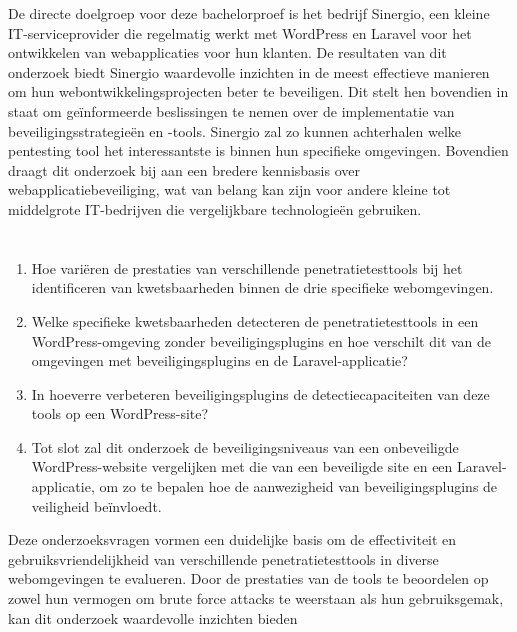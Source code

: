 De directe doelgroep voor deze bachelorproef is het bedrijf Sinergio, een kleine IT-serviceprovider die regelmatig 
werkt met WordPress en Laravel voor het ontwikkelen van webapplicaties voor hun klanten. De resultaten van dit 
onderzoek biedt Sinergio waardevolle inzichten in de meest effectieve manieren om hun webontwikkelingsprojecten beter 
te beveiligen. Dit stelt hen bovendien in staat om geïnformeerde beslissingen te nemen over de implementatie van 
beveiligingsstrategieën en -tools. Sinergio zal zo kunnen achterhalen welke pentesting tool het interessantste is binnen hun specifieke omgevingen.
Bovendien draagt dit onderzoek bij aan een bredere kennisbasis over webapplicatiebeveiliging, 
wat van belang kan zijn voor andere kleine tot middelgrote IT-bedrijven die vergelijkbare technologieën gebruiken.

\section{}%
\label{sec:onderzoeksvraag}
\begin{enumerate}
  \item Hoe variëren de prestaties van verschillende penetratietesttools bij het identificeren van kwetsbaarheden binnen de drie specifieke webomgevingen. 
  \item Welke specifieke kwetsbaarheden detecteren de penetratietesttools in een WordPress-omgeving zonder beveiligingsplugins en hoe verschilt dit van de omgevingen met beveiligingsplugins en de Laravel-applicatie? 
  \item In hoeverre verbeteren beveiligingsplugins de detectiecapaciteiten van deze tools op een WordPress-site? 
  \item Tot slot zal dit onderzoek de beveiligingsniveaus van een onbeveiligde WordPress-website vergelijken met die 
van een beveiligde site en een Laravel-applicatie, om zo te bepalen hoe de aanwezigheid van beveiligingsplugins de 
veiligheid beïnvloedt.
\end{enumerate}
Deze onderzoeksvragen vormen een duidelijke basis om de effectiviteit en gebruiksvriendelijkheid van 
verschillende penetratietesttools in diverse webomgevingen te evalueren. Door de prestaties van de 
tools te beoordelen op zowel hun vermogen om brute force attacks te weerstaan als hun gebruiksgemak, 
kan dit onderzoek waardevolle inzichten bieden

